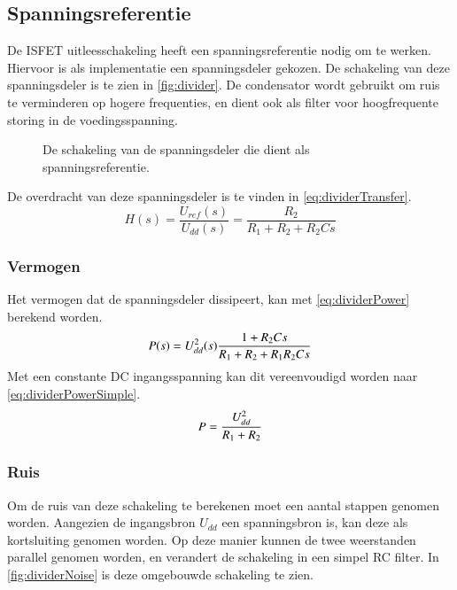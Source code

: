 \subsection{Spanningsreferentie}\label{sec:referenceVoltage}

De ISFET uitleesschakeling heeft een spanningsreferentie nodig om te werken.
Hiervoor is als implementatie een spanningsdeler gekozen. De schakeling van deze spanningsdeler is te zien in \autoref{fig:divider}.
De condensator wordt gebruikt om ruis te verminderen op hogere frequenties, en dient ook als filter voor hoogfrequente storing in de voedingsspanning.

\begin{figure}[ht]
    \centering
    \def\svgwidth{0.5\textwidth}
    
    \caption{De schakeling van de spanningsdeler die dient als spanningsreferentie.}
    \label{fig:divider}
\end{figure}

De overdracht van deze spanningsdeler is te vinden in \autoref{eq:dividerTransfer}.
\begin{equation}\label{eq:dividerTransfer}
    H(s) = \frac{U_{ref}(s)}{U_{dd}(s)} = \frac{R_2}{R_1 + R_2 + R_2Cs}
\end{equation}

\subsubsection{Vermogen}
Het vermogen dat de spanningsdeler dissipeert, kan met \autoref{eq:dividerPower} berekend worden.
\begin{equation}\label{eq:dividerPower}
    P(s) = U_{dd}^2(s)\frac{1+R_2Cs}{R_1 + R_2 + R_1R_2Cs}
    \tagaddtext{[\si{\watt}]}
\end{equation}
Met een constante DC ingangsspanning kan dit vereenvoudigd worden naar \autoref{eq:dividerPowerSimple}.
\begin{equation}\label{eq:dividerPowerSimple}
    P = \frac{U_{dd}^2}{R_1 + R_2}
    \tagaddtext{[\si{\watt}]}
\end{equation}

\subsubsection{Ruis}
Om de ruis van deze schakeling te berekenen moet een aantal stappen genomen worden. Aangezien de ingangsbron $U_{dd}$ een spanningsbron is, kan deze als kortsluiting genomen worden. Op deze manier kunnen de twee weerstanden parallel genomen worden, en verandert de schakeling in een simpel RC filter. In \autoref{fig:dividerNoise} is deze omgebouwde schakeling te zien.

